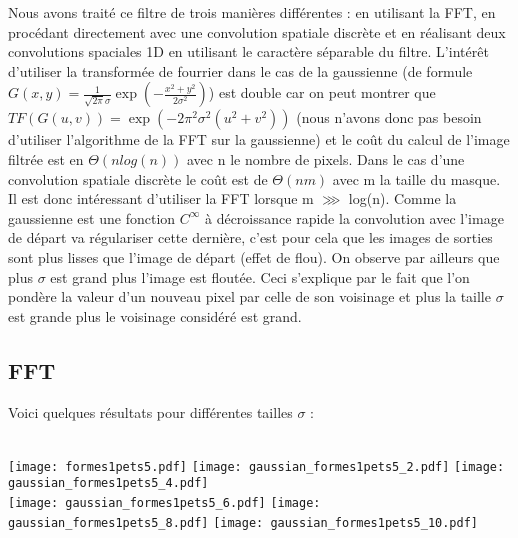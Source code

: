 \documentclass[12pt]{article}
\numberwithin{equation}{section}
\begin{document}
Nous avons traité ce filtre de trois manières différentes : en utilisant la FFT, en procédant directement avec une convolution spatiale discrète et en réalisant deux convolutions spaciales 1D en utilisant le caractère séparable du filtre. L'intérêt d'utiliser la transformée de fourrier dans le cas de la gaussienne (de formule $G(x,y) = \frac{1}{\sqrt{2\pi }\sigma}\exp({-\frac{x^2 + y^2}{2\sigma^2}})$) est double car on peut montrer que $TF(G(u,v)) = \exp({-2\pi^2 \sigma^2(u^2 + v^2)})$ (nous n'avons donc pas besoin d'utiliser l'algorithme de la FFT sur la gaussienne) et le coût du calcul de l'image filtrée est en $\Theta(nlog(n))$ avec n le nombre de pixels. Dans le cas d'une convolution spatiale discrète le coût est de $\Theta(nm)$ avec m la taille du masque. Il est donc intéressant d'utiliser la FFT lorsque m $\ggg $ log(n). 
Comme la gaussienne est une fonction $C^\infty$ à décroissance rapide la convolution avec l'image de départ va régulariser cette dernière, c'est pour cela que les images de sorties sont plus lisses que l'image de départ (effet de flou). On observe par ailleurs que plus $\sigma$ est grand plus l'image est floutée. Ceci s'explique par le fait que l'on pondère la valeur d'un nouveau pixel par celle de son voisinage et plus la taille $\sigma$ est grande plus le voisinage considéré est grand.

\subsection{FFT}
Voici quelques résultats pour différentes tailles $\sigma$ : \\\\
\begin{center}
\texttt{[image: formes1pets5.pdf]}
\texttt{[image: gaussian\_formes1pets5\_2.pdf]}
\texttt{[image: gaussian\_formes1pets5\_4.pdf]}\\
\texttt{[image: gaussian\_formes1pets5\_6.pdf]}
\texttt{[image: gaussian\_formes1pets5\_8.pdf]}
\texttt{[image: gaussian\_formes1pets5\_10.pdf]}
\end{center}
\end{document}
